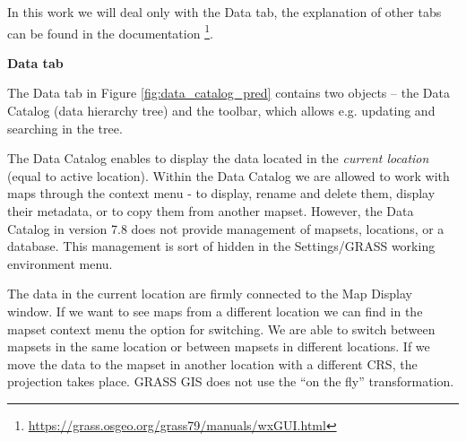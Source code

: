 \documentclass[a4paper,10pt,twoside]{article}
\begin{document}
\noindent In this work we will deal only with the Data tab, the
explanation of other tabs can be found in the documentation
\footnote{\url{https://grass.osgeo.org/grass79/manuals/wxGUI.html}}.
 
\bigskip
\noindent \textbf {Data tab}

\noindent The Data tab  in Figure \ref{fig:data_catalog_pred} contains 
two objects -- the Data Catalog (data hierarchy tree)
and the toolbar, which allows e.g. updating and searching in the tree.

The Data Catalog enables to display the data located in the 
\textit{current location} (equal to active location). Within the 
Data Catalog we are allowed to work with maps through
the context menu - to display, rename and delete them, display their
metadata, or to copy them from another mapset. However, the Data Catalog
in version 7.8 does not provide management of mapsets, locations, or a
database. This management is sort of hidden in the Settings/GRASS
working environment menu.

The data in the current location are firmly connected to the Map Display
window. If we want to see maps from a different location we can find in
the mapset context menu the option for switching. We are able to
switch between mapsets in the same location or between mapsets in
different locations. If we move the data to the mapset in another
location with a different CRS, the projection takes place. GRASS GIS
does not use the ``on the fly'' transformation.

\end{document}

